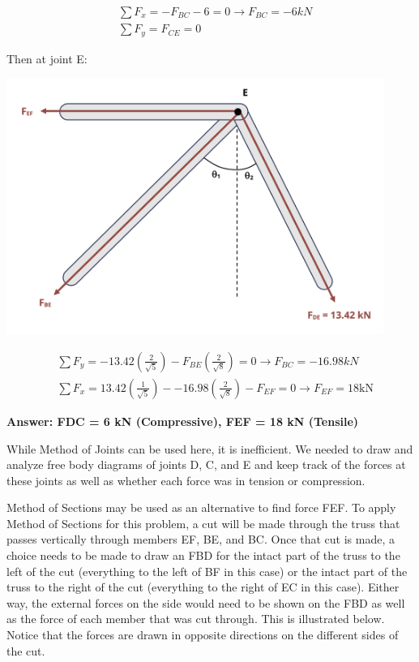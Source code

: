\documentclass[
  letterpaper,
  DIV=11,
  numbers=noendperiod]{scrreprt}
\begin{document}
\begin{tcolorbox}
\[
\begin{aligned}
&\sum F_x=-F_{B C}-6=0 \rightarrow F_{B C}=-6 k N\\
&\sum F_y=F_{C E}=0
\end{aligned}
\]

Then at joint E:

\begin{center}
\includegraphics[width=4.84375in,height=\textheight]{images/CH1 PNGs/example 1.4 part 4.png}
\end{center}

\[
\begin{aligned}
&\sum F_y=-13.42\left(\frac{2}{\sqrt{5}}\right)-F_{B E}\left(\frac{2}{\sqrt{8}}\right)=0 \rightarrow F_{B C}=-16.98 k N\\
&\sum F_x=13.42\left(\frac{1}{\sqrt{5}}\right)--16.98\left(\frac{2}{\sqrt{8}}\right)-F_{E F}=0 \rightarrow F_{E F}=18 \mathrm{kN}
\end{aligned}
\]

\textbf{Answer: FDC = 6 kN (Compressive), FEF = 18 kN (Tensile)}

While Method of Joints can be used here, it is inefficient. We needed to
draw and analyze free body diagrams of joints D, C, and E and keep track
of the forces at these joints as well as whether each force was in
tension or compression.

Method of Sections may be used as an alternative to find force FEF. To
apply Method of Sections for this problem, a cut will be made through
the truss that passes vertically through members EF, BE, and BC. Once
that cut is made, a choice needs to be made to draw an FBD for the
intact part of the truss to the left of the cut (everything to the left
of BF in this case) or the intact part of the truss to the right of the
cut (everything to the right of EC in this case). Either way, the
external forces on the side would need to be shown on the FBD as well as
the force of each member that was cut through. This is illustrated
below. Notice that the forces are drawn in opposite directions on the
different sides of the cut.


\end{tcolorbox}
\end{document}
